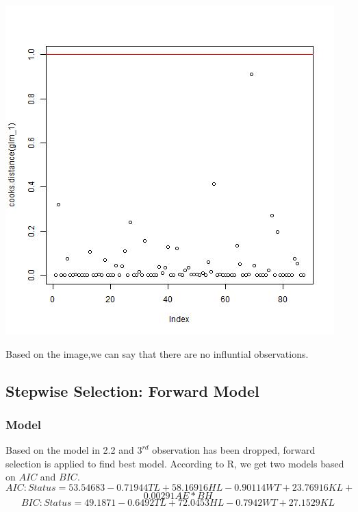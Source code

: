 \documentclass[12pt,a4paper]{article}
\begin{document}
\begin{center}
\includegraphics[scale = 0.6]{cook.jpg}
\end{center}
Based on the image,we can say that there are no influntial observations. 
\subsection{Stepwise Selection: Forward Model}
\subsubsection{Model}
Based on the model in 2.2 and $3^{rd}$ observation has been dropped, forward selection is applied to find best model. According to R, we get two models based on $AIC$ and $BIC$.
\[AIC : Status = 53.54683 - 0.71944TL + 58.16916HL - 0.90114WT + 23.76916KL +\]\[ 0.00291AE*BH\]
\[BIC : Status = 49.1871 - 0.6492TL + 72.0453HL - 0.7942WT + 27.1529KL\]
\end{document}
